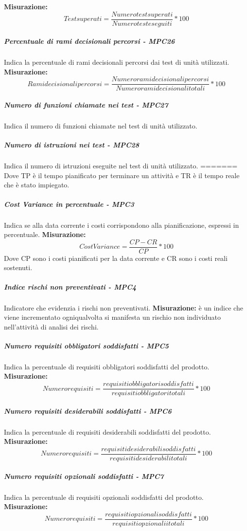 \textbf{Misurazione:}\begin{equation}
Test superati = \frac{Numero test superati}{Numero test eseguiti} * 100
\end{equation}
\subparagraph{Percentuale di rami decisionali percorsi - MPC26}
Indica la percentuale di rami decisionali percorsi dai test di unità utilizzati.
\textbf{Misurazione:}\begin{equation}
Rami decisionali percorsi = \frac{Numero rami decisionali percorsi}{Numero rami decisionali totali} * 100
\end{equation}
\subparagraph{Numero di funzioni chiamate nei test - MPC27}
Indica il numero di funzioni chiamate nel test di unità utilizzato.
\subparagraph{Numero di istruzioni nei test - MPC28}
Indica il numero di istruzioni eseguite nel test di unità utilizzato.
=======
Dove TP è il tempo pianificato per terminare un attività e TR è il tempo reale che è stato impiegato.
\subparagraph{Cost Variance in percentuale - MPC3}
Indica se alla data corrente i costi corrispondono alla pianificazione, espressi in percentuale.
\textbf{Misurazione:}\begin{equation}
Cost Variance = \frac{CP - CR}{CP}*100 
\end{equation}
Dove CP sono i costi pianificati per la data corrente e CR sono i costi reali sostenuti.
\subparagraph{Indice rischi non preventivati - MPC4}
Indicatore che evidenzia i rischi non preventivati.
\textbf{Misurazione:} è un indice che viene incrementato ogniqualvolta si manifesta un rischio non individuato nell'attività di analisi dei rischi.
\subparagraph{Numero requisiti obbligatori soddisfatti - MPC5}
Indica la percentuale di requisiti obbligatori soddisfatti del prodotto.
\textbf{Misurazione:}\begin{equation}
Numero requisiti = \frac{requisiti obbligatori soddisfatti}{requisiti obbligatori totali}*100
\end{equation}
\subparagraph{Numero requisiti desiderabili soddisfatti - MPC6}
Indica la percentuale di requisiti desiderabili soddisfatti del prodotto.
\textbf{Misurazione:}\begin{equation}
Numero requisiti = \frac{requisiti desiderabili soddisfatti}{requisiti desiderabili totali}*100
\end{equation}
\subparagraph{Numero requisiti opzionali soddisfatti - MPC7}
Indica la percentuale di requisiti opzionali soddisfatti del prodotto.
\textbf{Misurazione:}\begin{equation}
Numero requisiti = \frac{requisiti opzionali soddisfatti}{requisiti opzionalii totali}*100
\end{equation}


